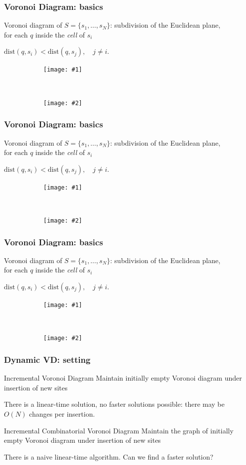 \def\paw{paw } \def\paws{paws } \def\Ot{\tilde O}

\def\animSlide#1#2{
\begin{frame} \frametitle{Voronoi Diagram: basics} \vspace{-7mm}

\begin{block}{\vspace*{-3ex}}
Voronoi diagram of $S = \{ s_1, \ldots, s_N \}$:
     subdivision of the Euclidean plane,\\
     for each $q$ inside the {\it cell} of $s_i$ \\ \medskip
\centerline{$\mathrm{dist} (q, s_i) < \mathrm{dist} (q, s_j),\quad j\ne i$.}
\end{block}

\begin{figure}[h] \centering
\begin{subfigure}[b]{0.46\textwidth} \centering
	\texttt{[image: \#1]}
	\label{fig:voronoiCircle}
\end{subfigure} ~~
\begin{subfigure}[b]{0.44\textwidth} \centering
	\texttt{[image: \#2]}
	\label{fig:Paw}
\end{subfigure}
\end{figure} \end{frame}
}

\animSlide{figs/voronoiDiagram}{figs/nCell}
\animSlide{figs/voronoiCircle}{figs/nCell}
\animSlide{figs/voronoiCircle}{figs/neighbor}

\begin{frame} \frametitle{Dynamic VD: setting}
\begin{block}{Incremental Voronoi Diagram}
	Maintain initially empty Voronoi diagram under insertion of new sites
\end{block} \smallskip

	There is a linear-time solution, no faster solutions possible: there may be \\
	$O(N)$ changes per insertion. \bigskip \pause

\begin{block}{Incremental Combinatorial Voronoi Diagram}
	Maintain the graph of initially empty Voronoi diagram under insertion of new sites
\end{block} \smallskip

	There is a naive linear-time algorithm. Can we find a faster solution?
\end{frame}

